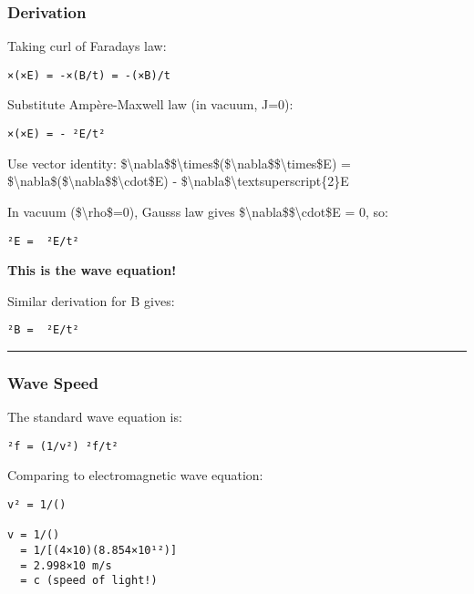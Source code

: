 \subsubsection{Derivation}\label{derivation}

Taking curl of Faraday\textquotesingle s law:

\begin{verbatim}
×(×E) = -×(B/t) = -(×B)/t
\end{verbatim}

Substitute Ampère-Maxwell law (in vacuum, J=0):

\begin{verbatim}
×(×E) = - ²E/t²
\end{verbatim}

Use vector identity:
\$\textbackslash nabla\$\$\textbackslash times\$(\$\textbackslash nabla\$\$\textbackslash times\$E)
=
\$\textbackslash nabla\$(\$\textbackslash nabla\$\$\textbackslash cdot\$E)
- \$\textbackslash nabla\$\textbackslash textsuperscript\{2\}E

In vacuum (\$\textbackslash rho\$=0), Gauss\textquotesingle s law gives
\$\textbackslash nabla\$\$\textbackslash cdot\$E = 0, so:

\begin{verbatim}
²E =  ²E/t²
\end{verbatim}

\textbf{This is the wave equation!}

Similar derivation for B gives:

\begin{verbatim}
²B =  ²E/t²
\end{verbatim}

\begin{center}\rule{0.5\linewidth}{0.5pt}\end{center}

\subsubsection{Wave Speed}\label{wave-speed}

The standard wave equation is:

\begin{verbatim}
²f = (1/v²) ²f/t²
\end{verbatim}

Comparing to electromagnetic wave equation:

\begin{verbatim}
v² = 1/()

v = 1/() 
  = 1/[(4×10)(8.854×10¹²)]
  = 2.998×10 m/s
  = c (speed of light!)
\end{verbatim}

